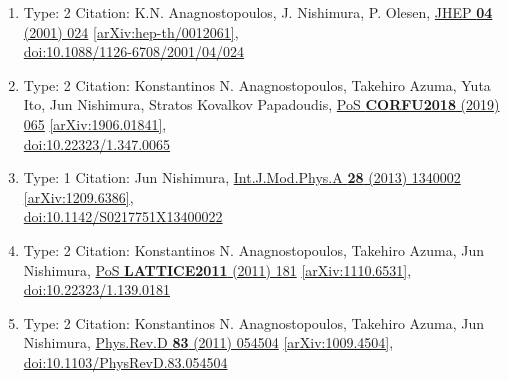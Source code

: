\documentclass[a4paper,10pt]{article}
\begin{document}
\begin{enumerate}
\begin{enumerate}
  \item Type: 2 Citation: K.N. Anagnostopoulos, J. Nishimura, P. Olesen, \href{https://www.doi.org/10.1088/1126-6708/2001/04/024}{JHEP {\bf 04} (2001) 024}  \href{https://arxiv.org/abs/hep-th/0012061}{[arXiv:hep-th/0012061]},\\\href{https://www.doi.org/10.1088/1126-6708/2001/04/024}{doi:10.1088/1126-6708/2001/04/024}
  \item Type: 2 Citation: Konstantinos N. Anagnostopoulos, Takehiro Azuma, Yuta Ito, Jun Nishimura, Stratos Kovalkov Papadoudis, \href{https://www.doi.org/10.22323/1.347.0065}{PoS {\bf CORFU2018} (2019) 065}  \href{https://arxiv.org/abs/1906.01841}{[arXiv:1906.01841]},\\\href{https://www.doi.org/10.22323/1.347.0065}{doi:10.22323/1.347.0065}
  \item Type: 1 Citation: Jun Nishimura, \href{https://www.doi.org/10.1142/S0217751X13400022}{Int.J.Mod.Phys.A {\bf 28} (2013) 1340002}  \href{https://arxiv.org/abs/1209.6386}{[arXiv:1209.6386]},\\\href{https://www.doi.org/10.1142/S0217751X13400022}{doi:10.1142/S0217751X13400022}
  \item Type: 2 Citation: Konstantinos N. Anagnostopoulos, Takehiro Azuma, Jun Nishimura, \href{https://www.doi.org/10.22323/1.139.0181}{PoS {\bf LATTICE2011} (2011) 181}  \href{https://arxiv.org/abs/1110.6531}{[arXiv:1110.6531]},\\\href{https://www.doi.org/10.22323/1.139.0181}{doi:10.22323/1.139.0181}
  \item Type: 2 Citation: Konstantinos N. Anagnostopoulos, Takehiro Azuma, Jun Nishimura, \href{https://www.doi.org/10.1103/PhysRevD.83.054504}{Phys.Rev.D {\bf 83} (2011) 054504}  \href{https://arxiv.org/abs/1009.4504}{[arXiv:1009.4504]},\\\href{https://www.doi.org/10.1103/PhysRevD.83.054504}{doi:10.1103/PhysRevD.83.054504}

\end{enumerate}
\end{enumerate}
\end{document}
